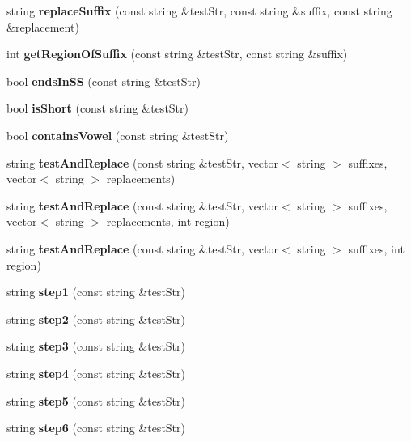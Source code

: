 \begin{DoxyCompactItemize}
string {\bfseries replace\+Suffix} (const string \&test\+Str, const string \&suffix, const string \&replacement)
\item 
\mbox{\label{class_grammar_machine_af3581e3ee6ff6161ade63ebc23c67bc9}} 
int {\bfseries get\+Region\+Of\+Suffix} (const string \&test\+Str, const string \&suffix)
\item 
\mbox{\label{class_grammar_machine_acdb2ce54e81f8ae3d5dd301f0719cc0a}} 
bool {\bfseries ends\+In\+SS} (const string \&test\+Str)
\item 
\mbox{\label{class_grammar_machine_a9bfc113fb8a1d90ad368503514f1596f}} 
bool {\bfseries is\+Short} (const string \&test\+Str)
\item 
\mbox{\label{class_grammar_machine_a3a01e6059bab568f5241f9fef358ff7e}} 
bool {\bfseries contains\+Vowel} (const string \&test\+Str)
\item 
\mbox{\label{class_grammar_machine_a835862d78da279ae370ad46759da9daf}} 
string {\bfseries test\+And\+Replace} (const string \&test\+Str, vector$<$ string $>$ suffixes, vector$<$ string $>$ replacements)
\item 
\mbox{\label{class_grammar_machine_ae3c8e28034fb3567291c324989694dc9}} 
string {\bfseries test\+And\+Replace} (const string \&test\+Str, vector$<$ string $>$ suffixes, vector$<$ string $>$ replacements, int region)
\item 
\mbox{\label{class_grammar_machine_a1979dc08d40d1b2616ebae1720fbf171}} 
string {\bfseries test\+And\+Replace} (const string \&test\+Str, vector$<$ string $>$ suffixes, int region)
\item 
\mbox{\label{class_grammar_machine_a8c220cec0285403299a1848584234b04}} 
string {\bfseries step1} (const string \&test\+Str)
\item 
\mbox{\label{class_grammar_machine_a1330916bdfe79421e163fa89137eb695}} 
string {\bfseries step2} (const string \&test\+Str)
\item 
\mbox{\label{class_grammar_machine_ad702ca391de6b08ebc533db37c0551ba}} 
string {\bfseries step3} (const string \&test\+Str)
\item 
\mbox{\label{class_grammar_machine_ac956344f4b562755dd070642f17794b3}} 
string {\bfseries step4} (const string \&test\+Str)
\item 
\mbox{\label{class_grammar_machine_aa557fa5f67df6839191be695656cbb91}} 
string {\bfseries step5} (const string \&test\+Str)
\item 
\mbox{\label{class_grammar_machine_a803253b00471e1f10149ab001a6b51c8}} 
string {\bfseries step6} (const string \&test\+Str)

\end{DoxyCompactItemize}
